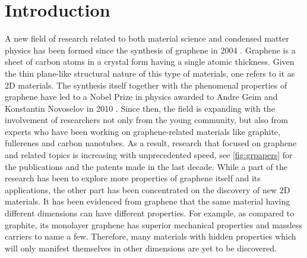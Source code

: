 
\chapter{Introduction \label{chap:1}}  %

\ifpdf
    \graphicspath{{Chapter1/Figs/Raster/}{Chapter1/Figs/PDF/}{Chapter1/Figs/}{Chapter1/Figs/Vector/}}
\else
    \graphicspath{{Chapter1/Figs/Vector/}{Chapter1/Figs/}}
\fi

A new field of research related to both material science and condensed matter physics has been formed since the synthesis of graphene in 2004 \cite{Novoselov666,Novoselov26072005}. Graphene is a sheet of carbon atoms in a crystal form having a single atomic thickness. Given the thin plane-like structural nature of this type of materials, one refers to it as 2D materials. The synthesis itself together with the phenomenal properties of graphene have led to a Nobel Prize in physics awarded to Andre Geim and Konstantin Novoselov in 2010 \cite{Geim2007}. Since then, the field is expanding with the involvement of researchers not only from the young community, but also from experts who have been working on graphene-related materials like graphite, fullerenes and carbon nanotubes. As a result, research that focused on graphene and related topics is increasing with unprecedented speed, see \autoref{fig:grpapers} for the publications and the patents made in the last decade. While a part of the research has been to explore more properties of graphene itself and its applications, the other part has been concentrated on the discovery of new 2D materials. It has been evidenced from graphene that the same material having different dimensions can have different properties. For example, as compared to graphite, its monolayer graphene has superior mechanical properties and massless carriers to name a few. Therefore, many materials with hidden properties which will only manifest themselves in other dimensions are yet to be discovered. 


